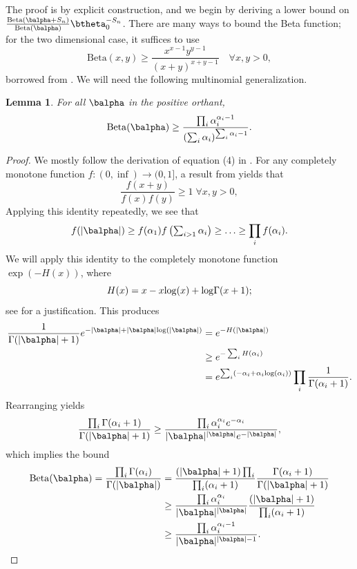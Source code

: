 \documentclass[11pt]{article}
\def\log{{\rm log}}
\newcommand{\Beta}{\mathrm{Beta}}
\newtheorem{lemma}{Lemma}[section]
\begin{document}
The proof is by explicit construction, and we begin by deriving a lower bound on 
$
 \frac{\Beta(\balpha + S_n)} {\Beta(\balpha)} \btheta_0 ^{-S_n}
$.
There are many ways to bound the Beta function; for the two dimensional case, it suffices to use
\begin{equation}\label{eq:Beta.lower.bound}
  \Beta(x,y) \geq \frac{x^{x-1}y^{y-1}}
  {(x+y)^{x+y-1}}\quad\forall x,y>0,
\end{equation}
borrowed from \cite{grenie2015inequalities}. We will need the following multinomial generalization.
\begin{lemma}\label{lem:beta.lower.bound}
  For all $\balpha$ in the positive orthant,
  \begin{equation*}
    \Beta(\balpha) \geq
    \frac{ \prod_i \alpha_i^{\alpha_i-1}}
    {(\sum_i \alpha_i)^{\sum_i \alpha_i-1}}.
  \end{equation*}
\end{lemma}
\begin{proof}
  We mostly follow the derivation of equation (4) in \cite{grenie2015inequalities}. For any completely monotone function $f:(0,\inf)\rightarrow(0,1]$, a result from \cite{kimberling1974probabilistic} yields that
\[
  \frac{f(x+y)}{f(x)f(y)} \geq 1 \; \forall x,y>0,
\]
Applying this identity repeatedly, we see that
\[
  f(|\balpha|)
  \geq
  f(\alpha_1)f\left(\textstyle \sum_{i>1} \alpha_i\right)
  \geq \ldots\geq
  \prod_i f(\alpha_i).
\]
We will apply this identity to the completely monotone function $\exp(-H(x))$, where
\[
  H(x) = x - x\log(x) + \log\Gamma(x+1);
\]
see \cite{grenie2015inequalities} for a justification. This produces
\begin{align*}
  \frac{1}{\Gamma(|\balpha|+1)}e^{-|\balpha|+|\balpha|\log(|\balpha|)}
  &=
  e^{-H\left(|\balpha|\right)}\\
  &\geq
    e^{-\sum_i H\left(\alpha_i\right)}\\
  &=
     e^{\sum_i\left(- \alpha_i + \alpha_i \log(\alpha_i)\right)}\prod_i\frac{1}{\Gamma(\alpha_i+1)}.
\end{align*}
Rearranging yields
\[
  \frac{\prod_i\Gamma(\alpha_i+1)}{\Gamma(|\balpha|+1)}
  \geq
  \frac{\prod_i \alpha_i^{\alpha_i}e^{-\alpha_i}}
  {|\balpha|^{|\balpha|}e^{-|\balpha|}},
\]
which implies the bound
\begin{align*}
  \Beta(\balpha)
  =
  \frac{\prod_i\Gamma(\alpha_i)}{\Gamma(|\balpha|)}
  &=
  \frac{(|\balpha|+1)\prod_i}
  {\prod_i (\alpha_i+1)}
   \frac{\Gamma(\alpha_i+1)}{\Gamma(|\balpha|+1)}\\
  &\geq
  \frac{\prod_i \alpha_i^{\alpha_i}}
  {|\balpha|^{|\balpha|}}
  \frac{(|\balpha|+1)}{\prod_i (\alpha_i+1)}\\
  &\geq
  \frac{\prod_i \alpha_i^{\alpha_i-1}}
  {|\balpha|^{|\balpha|-1}}.
\end{align*}
\end{proof}
\end{document}
